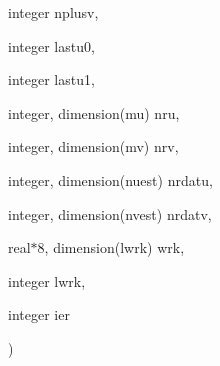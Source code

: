 {\begin{DoxyParamCaption}
\item[{integer}]{nplusv, }
\item[{integer}]{lastu0, }
\item[{integer}]{lastu1, }
\item[{integer, dimension(mu)}]{nru, }
\item[{integer, dimension(mv)}]{nrv, }
\item[{integer, dimension(nuest)}]{nrdatu, }
\item[{integer, dimension(nvest)}]{nrdatv, }
\item[{real$\ast$8, dimension(lwrk)}]{wrk, }
\item[{integer}]{lwrk, }
\item[{integer}]{ier}
\end{DoxyParamCaption}
)}\label{fpspgr_8f_a72390751ed710382aa3e2ef259e2a700}
